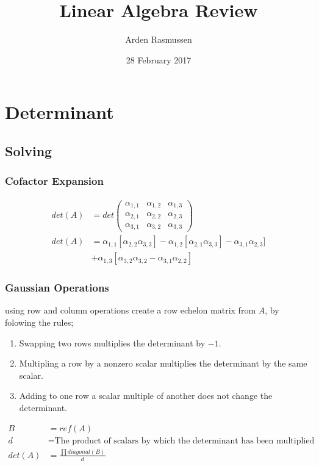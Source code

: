 \documentclass[12pt]{article}
\title{Linear Algebra Review}
\author{Arden Rasmussen}
\date{28 February 2017}
\begin{document}
\maketitle
\newpage
\tableofcontents
\newpage
{}
\section{Determinant}
\subsection{Solving}
\subsubsection{Cofactor Expansion}
\begin{align}
	det(A) &= det\left(\begin{array}{ccc}
	\alpha_{1,1} & \alpha_{1,2} & \alpha_{1,3}\\
	\alpha_{2,1} & \alpha_{2,2} & \alpha_{2,3}\\
	\alpha_{3,1} & \alpha_{3,2} & \alpha_{3,3}
	\end{array}\right)\\
	det(A) &= \alpha_{1,1}[\alpha_{2,2}\alpha_{3,3}] - \alpha_{1,2}[\alpha_{2,1}\alpha_{3,3}] - \alpha_{3,1}\alpha_{2,3}]\\
	&+\alpha_{1,3}[\alpha_{3,2}\alpha_{3,2} - \alpha_{3,1}\alpha_{2,2}]
\end{align}
\subsubsection{Gaussian Operations}
using row and column operations create a row echelon matrix from $A$, by folowing the rules;
\begin{enumerate}
	\item Swapping two rows multiplies the determinant by $-1$.
	\item Multipling a row by a nonzero scalar multiplies the determinant by the same scalar.
	\item Adding to one row a scalar multiple of another does not change the determinant.
\end{enumerate}
\begin{align}
	B &= ref(A)\\
	d &= \text{The product of scalars by which the determinant has been multiplied}\\
	det(A) &= \frac{\prod diagonal(B)}{d}
\end{align}
\end{document}
